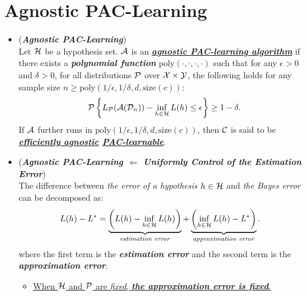 \documentclass[11pt]{article}
\begin{document}
\section{Agnostic PAC-Learning}
\begin{itemize}
\item \begin{definition} (\emph{\textbf{Agnostic PAC-Learning}})\\
Let ${\mathcal H}$ be a hypothesis set. ${\mathcal A}$ is an \underline{\emph{\textbf{agnostic PAC-learning algorithm}}} if there
exists a \emph{\textbf{polynomial function}} $\text{poly}(\cdot, \cdot, \cdot, \cdot)$  such that for any $\epsilon > 0$ and $\delta > 0$,
for all distributions ${\mathcal P}$ over ${\mathcal X} \times {\mathcal Y}$, the following holds for any sample size $n \ge \text{poly}(1/\epsilon, 1/\delta, d, \text{size}(c))$:
\begin{align}
{\mathcal P}\left\{L_{{\mathcal P}}({\mathcal A}({\mathcal D}_n)) - \inf_{h \in {\mathcal H}}L(h)  \le \epsilon \right\} \ge 1 - \delta. \label{eqn: agnostic_pac_definition}
\end{align} If ${\mathcal A}$ further runs in $\text{poly}(1/\epsilon, 1/\delta, d, \text{size}(c))$, then ${\mathcal C}$ is said to be \emph{\textbf{\underline{efficiently agnostic} \underline{PAC-learnable}}}. 
\end{definition}


\item \begin{remark} (\emph{\textbf{Agnostic PAC-Learning $\Leftarrow$ Uniformly Control of the Estimation Error}})\\
The difference between \emph{the error of a hypothesis} $h \in {\mathcal H}$ and \emph{the Bayes error} can be decomposed as:
\begin{align*}
L(h) - L^{*} &=\underbrace{\left(L(h) - \inf_{h \in {\mathcal H}}L(h)\right)}_{\text{\emph{estimation error}}} + \underbrace{\left(\inf_{h \in {\mathcal H}}L(h) - L^{*}\right)}_{\text{\emph{approximation error}}}.
\end{align*} 
where the first term is the \emph{\textbf{estimation error}} and the second term is the \emph{\textbf{approximation error}}.
\begin{itemize}
\item  \underline{When ${\mathcal H}$ and ${\mathcal P}$ are \emph{fixed}, \emph{\textbf{the approximation error is fixed}}.} 


\end{itemize}
\end{remark}
\end{itemize}
\end{document}
